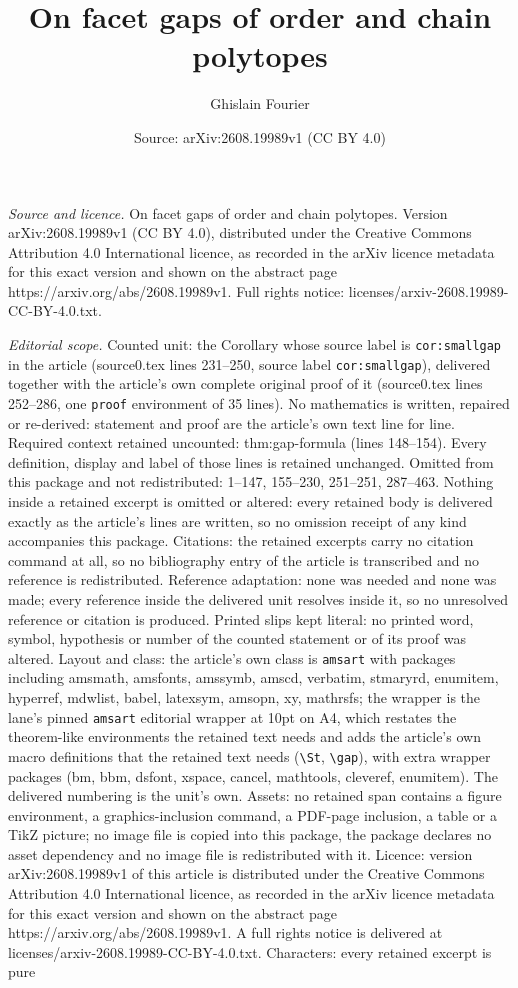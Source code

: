 \documentclass[10pt,a4paper]{amsart}
\title[On facet gaps of order and chain polytopes]{On facet gaps of order and chain polytopes}
\author{Ghislain Fourier}
\date{Source: arXiv:2608.19989v1 (CC BY 4.0)}
\begin{document}
\maketitle

\noindent\emph{Source and licence.} On facet gaps of order and chain polytopes. Version arXiv:2608.19989v1 (CC BY 4.0), distributed under the Creative Commons Attribution 4.0 International licence, as recorded in the arXiv licence metadata for this exact version and shown on the abstract page https://arxiv.org/abs/2608.19989v1. Full rights notice: licenses/arxiv-2608.19989-CC-BY-4.0.txt.\par\smallskip

\noindent\textit{Editorial scope.} Counted unit: the Corollary whose source label is \texttt{cor:smallgap} in the article (source0.tex lines 231--250, source label \texttt{cor:smallgap}), delivered together with the article's own complete original proof of it (source0.tex lines 252--286, one \texttt{proof} environment of 35 lines). No mathematics is written, repaired or re-derived: statement and proof are the article's own text line for line. Required context retained uncounted: thm:gap-formula (lines 148--154). Every definition, display and label of those lines is retained unchanged. Omitted from this package and not redistributed: 1--147, 155--230, 251--251, 287--463. Nothing inside a retained excerpt is omitted or altered: every retained body is delivered exactly as the article's lines are written, so no omission receipt of any kind accompanies this package. Citations: the retained excerpts carry no citation command at all, so no bibliography entry of the article is transcribed and no reference is redistributed. Reference adaptation: none was needed and none was made; every reference inside the delivered unit resolves inside it, so no unresolved reference or citation is produced. Printed slips kept literal: no printed word, symbol, hypothesis or number of the counted statement or of its proof was altered. Layout and class: the article's own class is \texttt{amsart} with packages including amsmath, amsfonts, amssymb, amscd, verbatim, stmaryrd, enumitem, hyperref, mdwlist, babel, latexsym, amsopn, xy, mathrsfs; the wrapper is the lane's pinned \texttt{amsart} editorial wrapper at 10pt on A4, which restates the theorem-like environments the retained text needs and adds the article's own macro definitions that the retained text needs (\texttt{\textbackslash St}, \texttt{\textbackslash gap}), with extra wrapper packages (bm, bbm, dsfont, xspace, cancel, mathtools, cleveref, enumitem). The delivered numbering is the unit's own. Assets: no retained span contains a figure environment, a graphics-inclusion command, a PDF-page inclusion, a table or a TikZ picture; no image file is copied into this package, the package declares no asset dependency and no image file is redistributed with it. Licence: version arXiv:2608.19989v1 of this article is distributed under the Creative Commons Attribution 4.0 International licence, as recorded in the arXiv licence metadata for this exact version and shown on the abstract page https://arxiv.org/abs/2608.19989v1. A full rights notice is delivered at licenses/arxiv-2608.19989-CC-BY-4.0.txt. Characters: every retained excerpt is pure 
\end{document}

